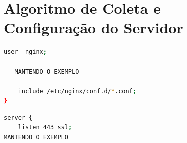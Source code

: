 



\chapter{Algoritmo de Coleta e Configuração do Servidor}\label{cap:apendicea}
\begin{lstlisting}[language=bash, caption={Configuração do Nginx utilizada nos experimentos}, label={lst:nginx-config}]
user  nginx;

-- MANTENDO O EXEMPLO

    include /etc/nginx/conf.d/*.conf;
}
\end{lstlisting}

\newpage

\begin{lstlisting}[language=bash, caption={Configuração do servidor Nginx com HTTP/2 e HTTP/3 (QUIC)}, label={lst:nginx-http3-config}]
server {
    listen 443 ssl;
MANTENDO O EXEMPLO
\end{lstlisting}

\newpage




